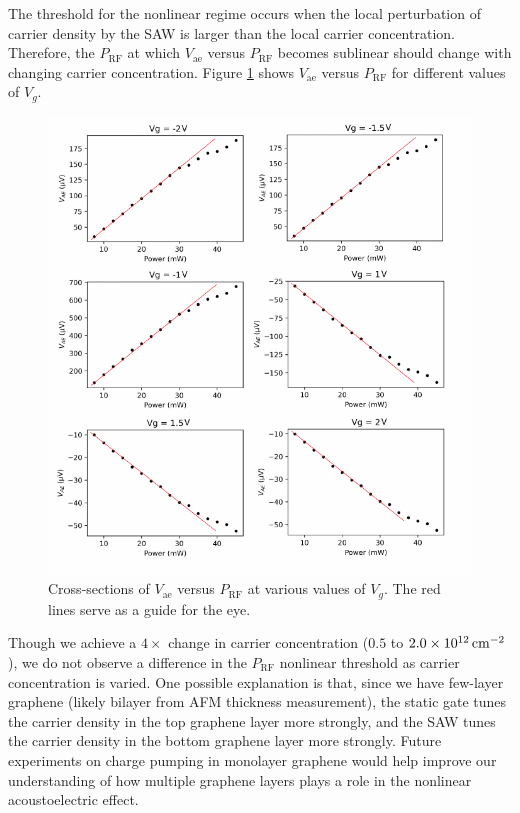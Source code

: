 \documentclass{beavtex_dub_edit}
\begin{document}
The threshold for the nonlinear regime occurs when the local perturbation of carrier density by the SAW is larger than the local carrier concentration. Therefore, the $P_{\mathrm{RF}}$ at which $V_{\mathrm{ae}}$ versus $P_{\mathrm{RF}}$ becomes sublinear should change with changing carrier concentration. Figure \ref{vae vs prf at different vg} shows $V_{\mathrm{ae}}$ versus $P_{\mathrm{RF}}$ for different values of $V_g$. 
\begin{figure}
    \includegraphics[width = 1\textwidth]{vae prf nonlinear at different vg.pdf}
    \caption{Cross-sections of $V_{\mathrm{ae}}$ versus $P_{\mathrm{RF}}$ at various values of $V_g$. The red lines serve as a guide for the eye.}
    \label{vae vs prf at different vg}
\end{figure}
Though we achieve a $4\times$ change in carrier concentration ($0.5$ to $\SI{2.0E12}{\centi\meter^{-2}}$), we do not observe a difference in the $P_{\mathrm{RF}}$ nonlinear threshold as carrier concentration is varied. One possible explanation is that, since we have few-layer graphene (likely bilayer from AFM thickness measurement), the static gate tunes the carrier density in the top graphene layer more strongly, and the SAW tunes the carrier density in the bottom graphene layer more strongly. Future experiments on charge pumping in monolayer graphene would help improve our understanding of how multiple graphene layers plays a role in the nonlinear acoustoelectric effect.
\end{document}
